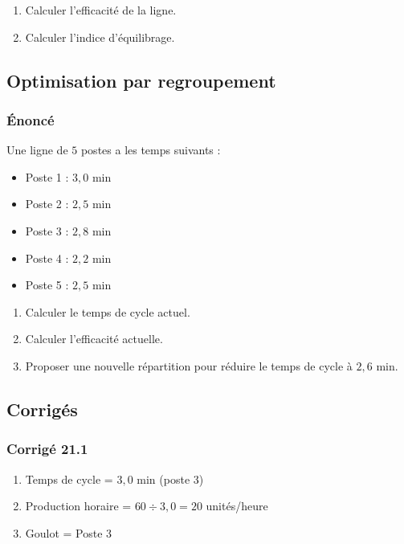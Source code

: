 \documentclass[a4paper,12pt]{article}
\begin{document}
\begin{enumerate}
    \item Calculer l'efficacité de la ligne.
    \item Calculer l'indice d'équilibrage.
\end{enumerate}

\subsection{Optimisation par regroupement}

\subsubsection*{Énoncé}

Une ligne de $5$ postes a les temps suivants :
\begin{itemize}
    \item Poste 1 : $3,0$ min
    \item Poste 2 : $2,5$ min
    \item Poste 3 : $2,8$ min
    \item Poste 4 : $2,2$ min
    \item Poste 5 : $2,5$ min
\end{itemize}

\begin{enumerate}
    \item Calculer le temps de cycle actuel.
    \item Calculer l'efficacité actuelle.
    \item Proposer une nouvelle répartition pour réduire le temps de cycle à $2,6$ min.
\end{enumerate}

\subsection{Corrigés}

\subsubsection*{Corrigé 21.1}

\begin{enumerate}
    \item Temps de cycle = $3,0$ min (poste 3)
    \item Production horaire = $60 \div 3,0 = 20$ unités/heure
    \item Goulot = Poste 3
\end{enumerate}
\end{document}
